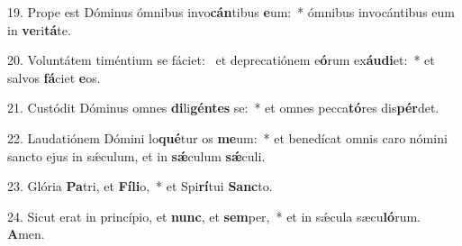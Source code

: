 19. Prope est Dóminus ómnibus invo\textbf{cán}tibus \textbf{e}um:~*  ómnibus invocántibus eum in \textbf{ve}ri\textbf{tá}te.\

20. Voluntátem timéntium se fáciet: \dag\  et deprecatiónem e\textbf{ó}rum ex\textbf{áu}\textbf{di}et:~*  et salvos \textbf{fá}ciet \textbf{e}os.\

21. Custódit Dóminus omnes \textbf{di}li\textbf{gén}\textbf{tes} se:~*  et omnes pecca\textbf{tó}res dis\textbf{pér}det.\

22. Laudatiónem Dómini lo\textbf{qué}tur os \textbf{me}um:~*  et benedícat omnis caro nómini sancto ejus in sǽculum, et in \textbf{sǽ}culum \textbf{sǽ}culi.\

23. Glória \textbf{Pa}tri, et \textbf{Fí}\textbf{li}o,~*  et Spi\textbf{rí}tui \textbf{Sanc}to.\

24. Sicut erat in princípio, et \textbf{nunc}, et \textbf{sem}per,~*  et in sǽcula sæcu\textbf{ló}rum. \textbf{A}men.\

